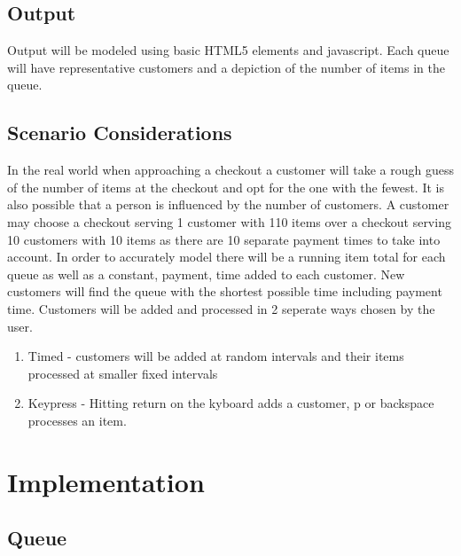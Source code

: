 \documentclass[pdftex,a4paper,10pt,titlepage]{article}
\begin{document}
\subsection{Output}
Output will be modeled using basic HTML5 elements and javascript. Each queue will have representative customers and a depiction of the number of items in the queue.
\subsection{Scenario Considerations}
In the real world when approaching a checkout a customer will take a rough guess of the number of items at the checkout and opt for the one with the fewest. It is also possible that a person is influenced by the number of customers. A customer may choose a checkout serving 1 customer with 110 items over a checkout serving 10 customers with 10 items as there are 10 separate payment times to take into account. In order to accurately model there will be a running item total for each queue as well as a constant, payment, time added to each customer. New customers will find the queue with the shortest possible time including payment time.
Customers will be added and processed in 2 seperate ways chosen by the user.
\begin{enumerate}
\item Timed - customers will be added at random intervals and their items processed at smaller fixed intervals
\item Keypress - Hitting return on the kyboard adds a customer, p or backspace processes an item.
\end{enumerate}
\pagebreak
\section{Implementation}

\subsection{Queue}
\end{document}
